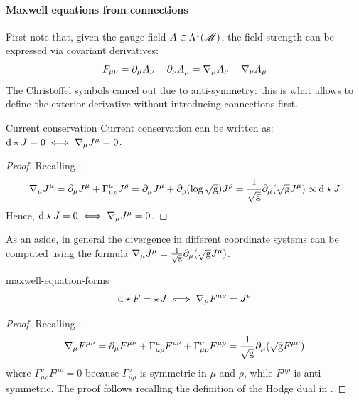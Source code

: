 \paragraph{Maxwell equations from connections}

First note that, given the gauge field $ A \in \Lambda^{1}(\mathscr{M}) $, the field strength can be expressed via covariant derivatives:
\begin{equation*}
  F_{\mu \nu} = \partial_\mu A_\nu - \partial_\nu A_\mu = \nabla_\mu A_\nu - \nabla_\nu A_\mu
\end{equation*}
The Christoffel symbols cancel out due to anti-symmetry: this is what allows to define the exterior derivative without introducing connections first.

\begin{proposition}{Current conservation}{}
  Current conservation can be written as: $ \mathrm{d} \star J = 0 \iff \nabla_\mu J^\mu = 0 $.
\end{proposition}

\begin{proofbox}
  \begin{proof}
    Recalling :
    \begin{equation*}
      \nabla_\mu J^\mu = \partial_\mu J^\mu + \Gamma^\mu_{\mu \rho} J^\rho = \partial_\mu J^\mu + \partial_\rho (\log \sqrt{\mathrm{g}}) J^\rho = \frac{1}{\sqrt{\mathrm{g}}} \partial_\mu (\sqrt{\mathrm{g}} J^\mu) \propto \mathrm{d} \star J
    \end{equation*}
    Hence, $ \mathrm{d} \star J = 0 \iff \nabla_\mu J^\mu = 0 $.
  \end{proof}
\end{proofbox}

As an aside, in general the divergence in different coordinate systems can be computed using the formula $ \nabla_\mu J^\mu = \frac{1}{\sqrt{\mathrm{g}}} \partial_\mu (\sqrt{\mathrm{g}} J^\mu) $.

\begin{proposition}[before upper = {\tcbtitle}]{}{maxwell-equation-forms}
  \begin{equation}
    \mathrm{d} \star F = \star\, J \iff \nabla_\mu F^{\mu \nu} = J^\nu
  \end{equation}
\end{proposition}

\begin{proofbox}
  \begin{proof}
    Recalling :
    \begin{equation*}
      \nabla_\mu F^{\mu \nu} = \partial_\mu F^{\mu \nu} + \Gamma^\mu_{\mu \rho} F^{\rho \nu} + \Gamma^\nu_{\mu \rho} F^{\mu \rho} = \frac{1}{\sqrt{\mathrm{g}}} \partial_\mu (\sqrt{\mathrm{g}} F^{\mu \nu})
    \end{equation*}
    where $ \Gamma^\nu_{\mu \rho} F^{\mu \rho} = 0 $ because $ \Gamma^\nu_{\mu \rho} $ is symmetric in $ \mu $ and $ \rho $, while $ F^{\mu \rho} $ is anti-symmetric. The proof follows recalling the definition of the Hodge dual in .
  \end{proof}
\end{proofbox}

